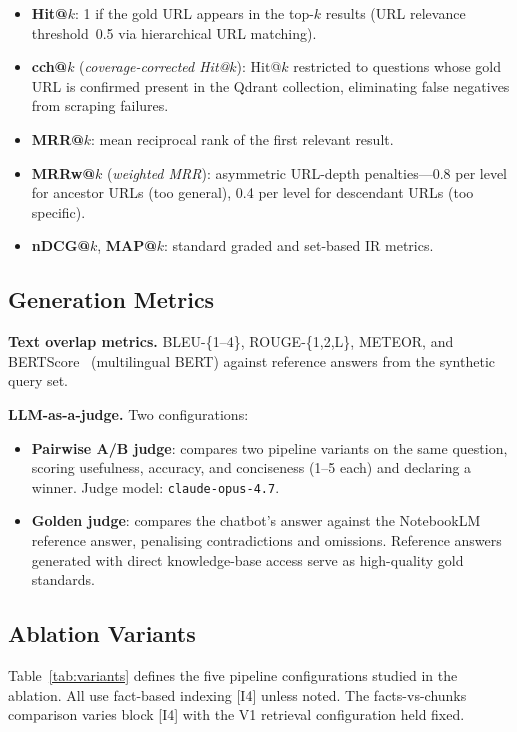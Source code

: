 \documentclass[sigconf,natbib=true]{acmart}
\begin{document}
\begin{itemize}[topsep=2pt,itemsep=0pt]
  \item \textbf{Hit@$k$}: 1 if the gold URL appears in the top-$k$ results (URL relevance threshold~0.5 via hierarchical URL matching).
  \item \textbf{cch@$k$} (\emph{coverage-corrected Hit@$k$}): Hit@$k$ restricted to questions whose gold URL is confirmed present in the Qdrant collection, eliminating false negatives from scraping failures.
  \item \textbf{MRR@$k$}: mean reciprocal rank of the first relevant result.
  \item \textbf{MRRw@$k$} (\emph{weighted MRR}): asymmetric URL-depth penalties---0.8 per level for ancestor URLs (too general), 0.4 per level for descendant URLs (too specific).
  \item \textbf{nDCG@$k$}, \textbf{MAP@$k$}: standard graded and set-based IR metrics.
\end{itemize}

\subsection{Generation Metrics}

\textbf{Text overlap metrics.}
BLEU-\{1--4\}, ROUGE-\{1,2,L\}, METEOR, and BERTScore~\cite{zhang2020bertscore} (multilingual BERT) against reference answers from the synthetic query set.

\textbf{LLM-as-a-judge.}
Two configurations:
\begin{itemize}[topsep=2pt,itemsep=0pt]
  \item \textbf{Pairwise A/B judge}: compares two pipeline variants on the same question, scoring usefulness, accuracy, and conciseness (1--5 each) and declaring a winner. Judge model: \texttt{claude-opus-4.7}.
  \item \textbf{Golden judge}: compares the chatbot's answer against the NotebookLM reference answer, penalising contradictions and omissions. Reference answers generated with direct knowledge-base access serve as high-quality gold standards.
\end{itemize}

\subsection{Ablation Variants}
\label{sec:variants}

Table~\ref{tab:variants} defines the five pipeline configurations studied in the ablation.
All use fact-based indexing [I4] unless noted.
The facts-vs-chunks comparison varies block [I4] with the V1 retrieval configuration held fixed.
\end{document}
